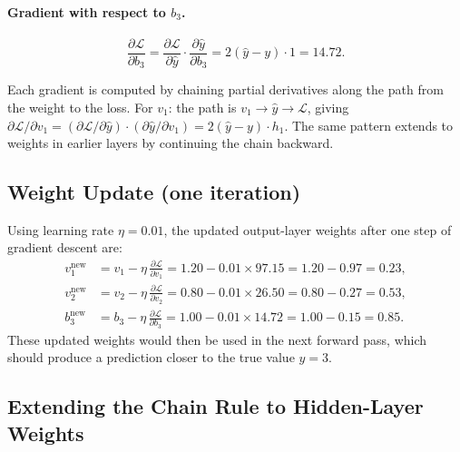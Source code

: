 \documentclass[12pt,a4paper]{article}
\newcommand{\Loss}{\mathcal{L}}
\newcommand{\yhat}{\hat{y}}
\begin{document}
\paragraph{Gradient with respect to $b_3$.}
\begin{equation}
  \frac{\partial \Loss}{\partial b_3}
    = \frac{\partial \Loss}{\partial \yhat} \cdot \frac{\partial \yhat}{\partial b_3}
    = 2(\yhat - y) \cdot 1
    = \mathbf{14.72}.
  \label{eq:grad-b3}
\end{equation}

\begin{keyinsight}[title=Chain Rule is the Engine of Backpropagation]
  Each gradient is computed by chaining partial derivatives along the path
  from the weight to the loss.  For $v_1$: the path is
  $v_1 \to \yhat \to \Loss$, giving
  $\partial\Loss/\partial v_1
   = (\partial\Loss/\partial\yhat)\cdot(\partial\yhat/\partial v_1)
   = 2(\yhat-y)\cdot h_1$.
  The same pattern extends to weights in earlier layers by continuing the
  chain backward.
\end{keyinsight}

\subsection{Weight Update (one iteration)}
\label{subsec:weight-update-example}

Using learning rate $\eta = 0.01$, the updated output-layer weights after one
step of gradient descent are:
\begin{align}
  v_1^{\mathrm{new}} &= v_1 - \eta\,\frac{\partial\Loss}{\partial v_1}
                      = 1.20 - 0.01 \times 97.15 = 1.20 - 0.97 = \mathbf{0.23}, \\
  v_2^{\mathrm{new}} &= v_2 - \eta\,\frac{\partial\Loss}{\partial v_2}
                      = 0.80 - 0.01 \times 26.50 = 0.80 - 0.27 = \mathbf{0.53}, \\
  b_3^{\mathrm{new}} &= b_3 - \eta\,\frac{\partial\Loss}{\partial b_3}
                      = 1.00 - 0.01 \times 14.72 = 1.00 - 0.15 = \mathbf{0.85}.
  \label{eq:weight-updates-example}
\end{align}
These updated weights would then be used in the next forward pass, which
should produce a prediction closer to the true value $y = 3$.

\subsection{Extending the Chain Rule to Hidden-Layer Weights}
\label{subsec:chain-rule-hidden}
\end{document}

